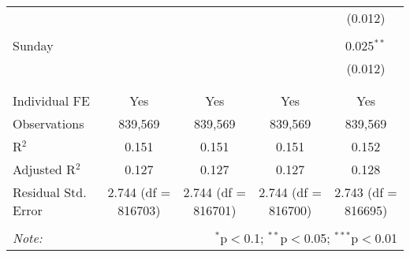 \documentclass[
]{article}
\begin{document}
\begin{table}[!htbp]
{\begin{tabular}{@{\extracolsep{5pt}}lcccc}
  &  &  &  & (0.012) \\ 
  & & & & \\ 
 Sunday &  &  &  & 0.025$^{**}$ \\ 
  &  &  &  & (0.012) \\ 
  & & & & \\ 
\hline \\[-1.8ex] 
Individual FE & Yes & Yes & Yes & Yes \\ 
Observations & 839,569 & 839,569 & 839,569 & 839,569 \\ 
R$^{2}$ & 0.151 & 0.151 & 0.151 & 0.152 \\ 
Adjusted R$^{2}$ & 0.127 & 0.127 & 0.127 & 0.128 \\ 
Residual Std. Error & 2.744 (df = 816703) & 2.744 (df = 816701) & 2.744 (df = 816700) & 2.743 (df = 816695) \\ 
\hline 
\hline \\[-1.8ex] 
\textit{Note:}  & \multicolumn{4}{r}{$^{*}$p$<$0.1; $^{**}$p$<$0.05; $^{***}$p$<$0.01} \\ 
\end{tabular}
} 
\end{table} 
\newpage
\end{document}
